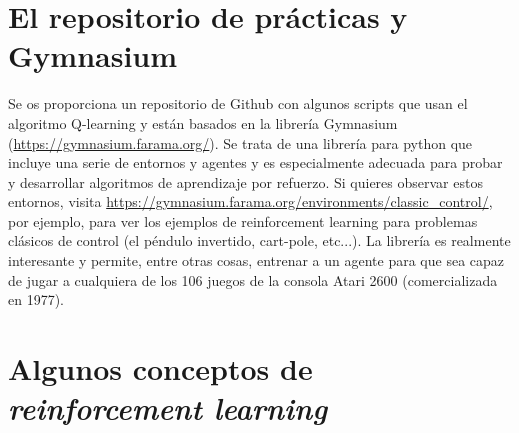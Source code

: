 \documentclass{article}
\begin{document}
\section{El repositorio de prácticas y Gymnasium}
Se os proporciona un repositorio de Github con algunos scripts que usan el algoritmo Q-learning y están basados en la librería Gymnasium (\url{https://gymnasium.farama.org/}). Se trata de una librería para python que incluye una serie de entornos y agentes y es especialmente adecuada para probar y desarrollar algoritmos de aprendizaje por refuerzo. Si quieres observar estos entornos, visita \url{https://gymnasium.farama.org/environments/classic_control/}, por ejemplo, para ver los ejemplos de reinforcement learning para problemas clásicos de control (el péndulo invertido, cart-pole, etc...). La librería es realmente interesante y permite, entre otras cosas, entrenar a un agente para que sea capaz de jugar a cualquiera de los 106 juegos de la consola Atari 2600 (comercializada en 1977).


\section{Algunos conceptos de \textit{reinforcement learning}}
\end{document}
